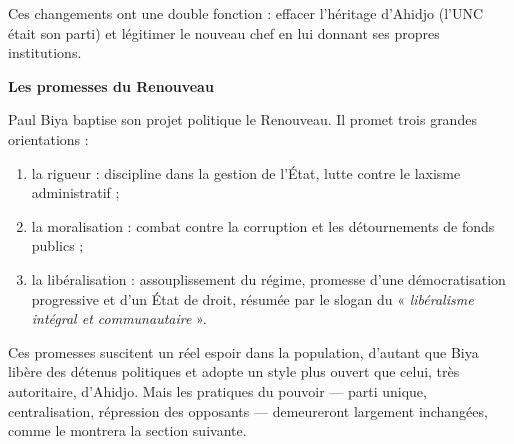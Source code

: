 \documentclass[11pt]{article}
\newcommand{\cle}[1]{{\popxbold\color{popdark}#1}}
\begin{document}
Ces changements ont une double fonction : effacer l'héritage d'Ahidjo (l'UNC était son parti) et légitimer le nouveau chef en lui donnant ses propres institutions.

\textbf{Les promesses du Renouveau}\par

Paul Biya baptise son projet politique le \cle{Renouveau}. Il promet trois grandes orientations :
\begin{enumerate}
\item la \cle{rigueur} : discipline dans la gestion de l'État, lutte contre le laxisme administratif ;
\item la \cle{moralisation} : combat contre la corruption et les détournements de fonds publics ;
\item la \cle{libéralisation} : assouplissement du régime, promesse d'une démocratisation progressive et d'un État de droit, résumée par le slogan du « \emph{libéralisme intégral et communautaire} ».
\end{enumerate}

Ces promesses suscitent un réel espoir dans la population, d'autant que Biya libère des détenus politiques et adopte un style plus ouvert que celui, très autoritaire, d'Ahidjo. Mais les pratiques du pouvoir — parti unique, centralisation, répression des opposants — demeureront largement inchangées, comme le montrera la section suivante.
\end{document}
